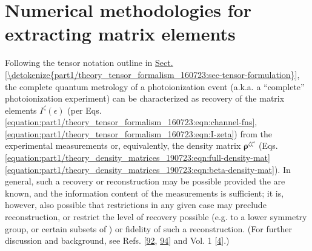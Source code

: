 \documentclass[letterpaper,table,10pt,english]{jupyterBook}
\begin{document}
\chapter{Numerical methodologies for extracting matrix elements}
\label{\detokenize{part1/numerics_070723:numerical-methodologies-for-extracting-matrix-elements}}\label{\detokenize{part1/numerics_070723:chpt-numerical-details}}\label{\detokenize{part1/numerics_070723::doc}}
\sphinxAtStartPar
Following the tensor notation outline in \hyperref[\detokenize{part1/theory_tensor_formalism_160723:sec-tensor-formulation}]{Sect.\@ \ref{\detokenize{part1/theory_tensor_formalism_160723:sec-tensor-formulation}}}, the complete quantum metrology of a photoionization event (a.k.a. a “complete” photoionization experiment) can be characterized as recovery of the matrix elements \(I^{\zeta}(\epsilon)\) (per Eqs. \eqref{equation:part1/theory_tensor_formalism_160723:eqn:channel-fns}, \eqref{equation:part1/theory_tensor_formalism_160723:eqn:I-zeta}) from the experimental measurements or, equivalently, the density matrix \(\mathbf{\rho}^{\zeta\zeta'}\) (Eqs. \eqref{equation:part1/theory_density_matrices_190723:eqn:full-density-mat} \sphinxhyphen{} \eqref{equation:part1/theory_density_matrices_190723:eqn:beta-density-mat}). In general, such a recovery or reconstruction may be possible provided the {\hyperref[\detokenize{backmatter/glossary:term-channel-functions}]{}} are known, and the information content of the measurements is sufficient; it is, however, also possible that restrictions in any given case may preclude reconstruction, or restrict the level of recovery possible (e.g. to a lower symmetry group, or certain subsets of {\hyperref[\detokenize{backmatter/glossary:term-radial-matrix-elements}]{}}) or fidelity of such a reconstruction. (For further discussion and background, see Refs. {[}\hyperlink{cite.backmatter/bibliography:id840}{92}, \hyperlink{cite.backmatter/bibliography:id724}{94}{]} and  Vol. 1 {[}\hyperlink{cite.backmatter/bibliography:id676}{4}{]}.)
\end{document}
